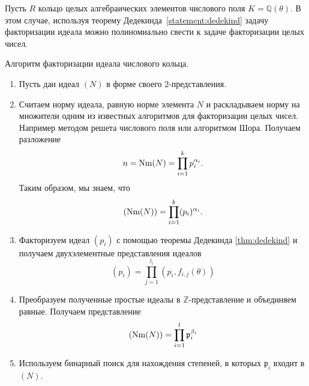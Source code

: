 \documentclass[_00_dissertation.tex]{subfiles}
\begin{document}
Пусть $R$ кольцо целых алгебраических элементов числового поля $K = \mathbb{Q}(\theta)$.
В этом случае, используя теорему Дедекинда~\ref{statement:dedekind} задачу факторизации идеала можно полиномиально свести к задаче факторизации целых чисел.

\begin{algorithm}
    Алгоритм факторизации идеала числового кольца.

    \begin{enumerate}
        \item Пусть дан идеал $(N)$ в форме своего $2$-представления.
        
        \item Считаем норму идеала, равную норме элемента $N$ и раскладываем норму на множители одним из известных алгоритмов для факторизации целых чисел.
        Например методом решета числового поля или алгоритмом Шора.
        Получаем разложение
        \begin{equation*}
            n = \textrm{Nm}(N) = \prod_{i=1}^{k} p_i^{\alpha_i}.
        \end{equation*}
        Таким образом, мы знаем, что
        \begin{equation*}
            (\textrm{Nm}(N)) = \prod_{i=1}^{k} (p_i)^{\alpha_i}.
        \end{equation*}
    
        \item Факторизуем идеал $(p_i)$ с помощью теоремы Дедекинда \ref{thm:dedekind} и получаем двухэлементные представления идеалов
        \begin{equation*}
            (p_i) = \prod_{j=1}^{l_i} (p_i, f_{i, j}(\theta))
        \end{equation*}
    
        \item Преобразуем полученные простые идеалы в $\mathbb{Z}$-представление и объединяем равные.
        Получаем представление
        \begin{equation*}
            (\textrm{Nm}(N)) = \prod_{i=1}^{l} \mathfrak{p}_i^{\beta_i}
        \end{equation*}
    
        \item Используем бинарный поиск для нахождения степеней, в которых $\mathfrak{p}_i$ входит в $(N)$.
    \end{enumerate}
\end{algorithm}
\end{document}

